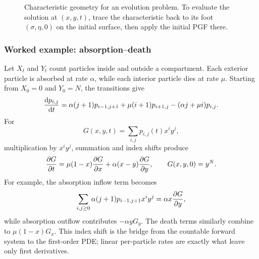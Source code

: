 \begin{figure}[tbp]
  \centering
  \caption{Characteristic geometry for an evolution problem.  To evaluate the
  solution at $(x,y,t)$, trace the characteristic back to its foot
  $(\sigma,\eta,0)$ on the initial surface, then apply the initial PGF there.}
  \label{m:fig:characteristic-geometry}
\end{figure}

\subsubsection*{Worked example: absorption--death}

Let $X_t$ and $Y_t$ count particles inside and outside a compartment.  Each exterior
particle is absorbed at rate $\alpha$, while each interior particle dies at rate
$\mu$.  Starting from $X_0=0$ and $Y_0=N$, the transitions give
\begin{equation}
  \frac{\mathrm{d} p_{i,j}}{\mathrm{d} t}
  =\alpha(j+1)p_{i-1,j+1}+\mu(i+1)p_{i+1,j}
   -(\alpha j+\mu i)p_{i,j}.
  \label{m:eq:absdeath-forward}
\end{equation}
For
\[
  G(x,y,t)=\sum_{i,j}p_{i,j}(t)x^iy^j,
\]
multiplication by $x^iy^j$, summation and index shifts produce
\begin{equation}
  \frac{\partial G}{\partial t}=\mu(1-x)\frac{\partial G}{\partial x}+\alpha(x-y)\frac{\partial G}{\partial y},
  \qquad G(x,y,0)=y^N.
  \label{m:eq:absdeath-pde}
\end{equation}
For example, the absorption inflow term becomes
\[
  \sum_{i,j\geq0}\alpha(j+1)p_{i-1,j+1}x^iy^j
  =\alpha x\frac{\partial G}{\partial y},
\]
while absorption outflow contributes $-\alpha yG_y$.  The death terms similarly
combine to $\mu(1-x)G_x$.  This index shift is the bridge from the countable
forward system to the first-order PDE; linear per-particle rates are exactly what
leave only first derivatives.

